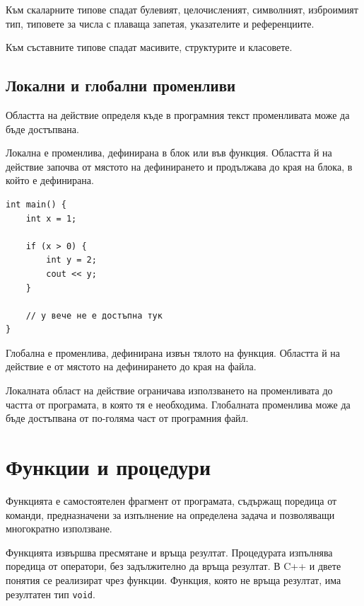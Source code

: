 Към скаларните типове спадат булевият, целочисленият, символният, изброимият тип, типовете за числа с плаваща запетая, указателите и референциите.

Към съставните типове спадат масивите, структурите и класовете.

\subsection{Локални и глобални променливи}\label{s:14.5.4}

Областта на действие определя къде в програмния текст променливата може да бъде достъпвана.

\begin{defn}
Локална е променлива, дефинирана в блок или във функция. Областта й на действие започва от мястото на дефинирането и продължава до края на блока, в който е дефинирана.
\end{defn}

\begin{example}
\begin{verbatim}
int main() {
    int x = 1;

    if (x > 0) {
        int y = 2;
        cout << y;
    }

    // y вече не е достъпна тук
}
\end{verbatim}
\end{example}

\begin{defn}
Глобална е променлива, дефинирана извън тялото на функция. Областта й на действие е от мястото на дефинирането до края на файла.
\end{defn}

Локалната област на действие ограничава използването на променливата до частта от програмата, в която тя е необходима. Глобалната променлива може да бъде достъпвана от по-голяма част от програмния файл.

\section{Функции и процедури}\label{s:14.6}

\begin{defn}[Функция]
Функцията е самостоятелен фрагмент от програмата, съдържащ поредица от команди, предназначени за изпълнение на определена задача и позволяващи многократно използване.
\end{defn}

Функцията извършва пресмятане и връща резултат. Процедурата изпълнява поредица от оператори, без задължително да връща резултат. В C++ и двете понятия се реализират чрез функции. Функция, която не връща резултат, има резултатен тип \texttt{void}.

